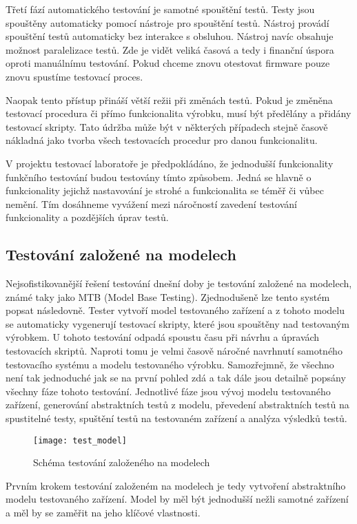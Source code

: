 Třetí fází automatického testování je samotné spouštění testů. Testy jsou spouštěny automaticky pomocí nástroje pro spouštění testů. Nástroj provádí spouštění testů automaticky bez interakce s obsluhou. Nástroj navíc obsahuje možnost paralelizace testů. Zde je vidět veliká časová a tedy i finanční úspora oproti manuálnímu testování. Pokud chceme znovu otestovat firmware pouze znovu spustíme testovací proces.

Naopak tento přístup přináší větší režii při změnách testů. Pokud je změněna testovací procedura či přímo funkcionalita výrobku, musí být předělány a přidány testovací skripty. Tato údržba může být v některých případech stejně časově nákladná jako tvorba všech testovacích procedur pro danou funkcionalitu.

V projektu testovací laboratoře je předpokládáno, že jednodušší funkcionality funkčního testování budou testovány tímto způsobem. Jedná se hlavně o funkcionality jejichž nastavování je strohé a funkcionalita se téměř či vůbec nemění. Tím dosáhneme vyvážení mezi náročností zavedení testování funkcionality a pozdějších úprav testů.

\subsection{Testování založené na modelech}
Nejsofistikovanější řešení testování dnešní doby je testování založené na modelech, známé taky jako MTB (Model Base Testing). Zjednodušeně lze tento systém popsat následovně. Tester vytvoří model testovaného zařízení a z tohoto modelu se automaticky vygenerují testovací skripty, které jsou spouštěny nad testovaným výrobkem. U tohoto testování odpadá spoustu času při návrhu a úpravách testovacích skriptů. Naproti tomu je velmi časově náročné navrhnutí samotného testovacího systému a modelu testovaného výrobku. Samozřejmně, že všechno není tak jednoduché jak se na první pohled zdá a tak dále jsou detailně popsány všechny fáze tohoto testování. Jednotlivé fáze jsou vývoj modelu testovaného zařízení, generování abstraktních testů z modelu, převedení abstraktních testů na spustitelné testy, spuštění testů na testovaném zařízení a analýza výsledků testů.

\begin{figure}[h]
  \centering
  \texttt{[image: test\_model]}
  \caption{Schéma testování založeného na modelech}
  \label{fig:test_model}
\end{figure}

Prvním krokem testování založeném na modelech je tedy vytvoření abstraktního modelu testovaného zařízení. Model by měl být jednodušší nežli samotné zařízení a měl by se zaměřit na jeho klíčové vlastnosti.

